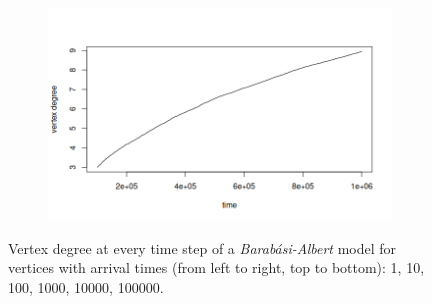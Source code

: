 \begin{figure}[ht]
\begin{subfigure}{.5\textwidth}
\end{subfigure}%
\begin{subfigure}{.5\textwidth}
  \centering
  \includegraphics[width=\linewidth]{figures/scaling_BA/sc_ba_5.png}
\end{subfigure}
\caption{Vertex degree at every time step of a \textit{Barabási-Albert} model for vertices with arrival times (from left to right, top to bottom): 1, 10, 100, 1000, 10000, 100000.}
\label{fig:scaling_BA}
\end{figure}

